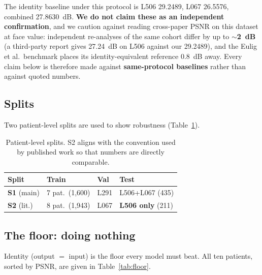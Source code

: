 \documentclass[conference]{IEEEtran}
\begin{document}
The identity baseline under this protocol is L506 29.2489, L067 26.5576,
combined 27.8630~dB. \textbf{We do not claim these as an independent
confirmation}, and we caution against reading cross-paper PSNR on this dataset at
face value: independent re-analyses of the same cohort differ by up to
\textbf{$\sim$2~dB} (a third-party report gives 27.24~dB on L506 against our
29.2489), and the Eulig et al.\ benchmark places its identity-equivalent
reference 0.8~dB away. Every claim below is therefore made against
\textbf{same-protocol baselines} rather than against quoted numbers.

\subsection{Splits}
Two patient-level splits are used to show robustness
(Table~\ref{tab:splits}).

\begin{table}[t]
\centering
\caption{Patient-level splits. S2 aligns with the convention used by published
work so that numbers are directly comparable.}
\label{tab:splits}
\small
\begin{tabular}{@{}llll@{}}
\toprule
Split & Train & Val & Test\\
\midrule
\textbf{S1} (main) & 7 pat.\ (1,600) & L291 & L506+L067 (435)\\
\textbf{S2} (lit.) & 8 pat.\ (1,943) & L067 & \textbf{L506 only} (211)\\
\bottomrule
\end{tabular}
\end{table}

\subsection{The floor: doing nothing}
Identity (output $=$ input) is the floor every model must beat. All ten
patients, sorted by PSNR, are given in Table~\ref{tab:floor}.
\end{document}

